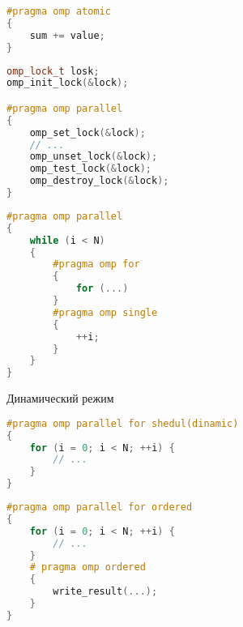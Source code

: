 \begin{frame}[fragile]

\begin{lstlisting}[language=C++,basicstyle=\ttfamily,keywordstyle=\color{blue},basicstyle=\scriptsize]
#pragma omp atomic
{
    sum += value;
}
\end{lstlisting}

\end{frame}

\begin{frame}[fragile]

\begin{lstlisting}[language=C++,basicstyle=\ttfamily,keywordstyle=\color{blue},basicstyle=\scriptsize]
omp_lock_t losk;
omp_init_lock(&lock);

#pragma omp parallel
{
    omp_set_lock(&lock);
    // ...
    omp_unset_lock(&lock);
    omp_test_lock(&lock);
    omp_destroy_lock(&lock);
}
\end{lstlisting}

\end{frame}

\begin{frame}[fragile]

\begin{lstlisting}[language=C++,basicstyle=\ttfamily,keywordstyle=\color{blue},basicstyle=\scriptsize]
#pragma omp parallel
{
    while (i < N)
    {
        #pragma omp for
        {
            for (...)
        }
        #pragma omp single
        {
            ++i;
        }
    }
}
\end{lstlisting}

\end{frame}

\begin{frame}[fragile]{Динамический режим}

\begin{lstlisting}[language=C++,basicstyle=\ttfamily,keywordstyle=\color{blue},basicstyle=\scriptsize]
#pragma omp parallel for shedul(dinamic)
{
    for (i = 0; i < N; ++i) {
        // ...
    }
}
\end{lstlisting}

\end{frame}

\begin{frame}[fragile]

\begin{lstlisting}[language=C++,basicstyle=\ttfamily,keywordstyle=\color{blue},basicstyle=\scriptsize]
#pragma omp parallel for ordered
{
    for (i = 0; i < N; ++i) {
        // ...
    }
    # pragma omp ordered
    {
        write_result(...);
    }
}
\end{lstlisting}

\end{frame}

